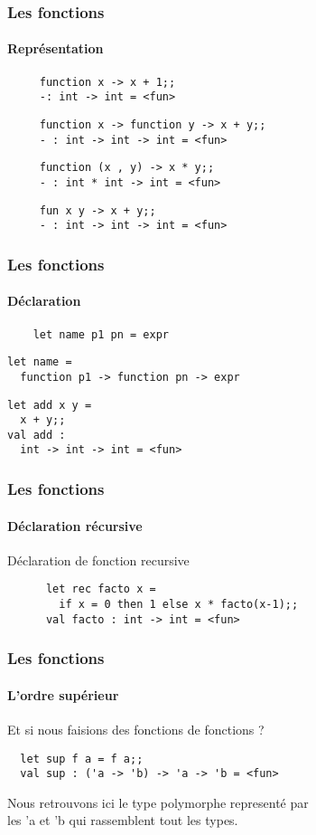 \begin{frame}[fragile]
	\frametitle{Les fonctions}
	\framesubtitle{Représentation}
	\begin{center}
		\begin{minipage}{10cm}
				\begin{lstlisting}
     function x -> x + 1;;
     -: int -> int = <fun>
				\end{lstlisting}
				\begin{lstlisting}
     function x -> function y -> x + y;;
     - : int -> int -> int = <fun>
				\end{lstlisting}
				\begin{lstlisting}
     function (x , y) -> x * y;;
     - : int * int -> int = <fun>
				\end{lstlisting}
				\begin{lstlisting}
     fun x y -> x + y;;
     - : int -> int -> int = <fun>
				\end{lstlisting}
		\end{minipage}
  \end{center}
\end{frame}

\begin{frame}[fragile]
	\frametitle{Les fonctions}
  	\framesubtitle{Déclaration}
    	\begin{lstlisting}
	let name p1 pn = expr
    	\end{lstlisting}
	\begin{lstlisting}
let name = 
  function p1 -> function pn -> expr
  	\end{lstlisting}
  	\vspace{0.4cm}
  	\begin{lstlisting}
let add x y = 
  x + y;;
val add : 
  int -> int -> int = <fun>
  	\end{lstlisting}
\end{frame}

\begin{frame}[fragile]
	\frametitle{Les fonctions}
	\framesubtitle{Déclaration récursive}
	\begin{block}{Déclaration de fonction recursive} 
	  \begin{lstlisting}
	  let rec facto x = 
	  	if x = 0 then 1 else x * facto(x-1);;
	  val facto : int -> int = <fun>
	  \end{lstlisting}
	\end{block}
\end{frame}

\begin{frame}[fragile]
	\frametitle{Les fonctions}
  	\framesubtitle{L'ordre supérieur}
  	Et si nous faisions des fonctions de fonctions ? 
 	\begin{lstlisting}
  let sup f a = f a;;
  val sup : ('a -> 'b) -> 'a -> 'b = <fun>
 	\end{lstlisting}
	Nous retrouvons ici le type polymorphe representé par\\
	les 'a et 'b qui rassemblent tout les types.
\end{frame}

